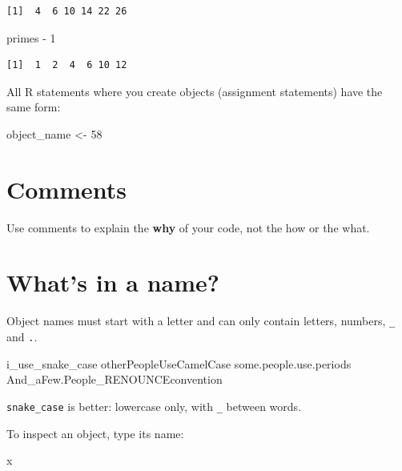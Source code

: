 \documentclass[
  letterpaper,
  DIV=11,
  numbers=noendperiod]{scrreprt}
\newenvironment{Shaded}{\begin{snugshade}}{\end{snugshade}}
\newcommand{\DecValTok}[1]{\textcolor[rgb]{0.68,0.00,0.00}{#1}}
\newcommand{\NormalTok}[1]{\textcolor[rgb]{0.00,0.23,0.31}{#1}}
\newcommand{\OtherTok}[1]{\textcolor[rgb]{0.00,0.23,0.31}{#1}}
\newcommand{\SpecialCharTok}[1]{\textcolor[rgb]{0.37,0.37,0.37}{#1}}
\begin{document}
\begin{verbatim}
[1]  4  6 10 14 22 26
\end{verbatim}

\begin{Shaded}
\begin{Highlighting}[]
\NormalTok{primes }\SpecialCharTok{{-}} \DecValTok{1}
\end{Highlighting}
\end{Shaded}

\begin{verbatim}
[1]  1  2  4  6 10 12
\end{verbatim}

All R statements where you create objects (assignment statements) have
the same form:

\begin{Shaded}
\begin{Highlighting}[]
\NormalTok{object\_name }\OtherTok{\textless{}{-}} \DecValTok{58}
\end{Highlighting}
\end{Shaded}

\section{Comments}\label{comments}

Use comments to explain the \textbf{why} of your code, not the how or
the what.

\section{What's in a name?}\label{whats-in-a-name}

Object names must start with a letter and can only contain letters,
numbers, \texttt{\_} and \texttt{.}.

\begin{Shaded}
\begin{Highlighting}[]
\NormalTok{i\_use\_snake\_case}
\NormalTok{otherPeopleUseCamelCase}
\NormalTok{some.people.use.periods}
\NormalTok{And\_aFew.People\_RENOUNCEconvention}
\end{Highlighting}
\end{Shaded}

\texttt{snake\_case} is better: lowercase only, with \texttt{\_} between
words.

To inspect an object, type its name:

\begin{Shaded}
\begin{Highlighting}[]
\NormalTok{x}
\end{Highlighting}
\end{Shaded}
\end{document}
